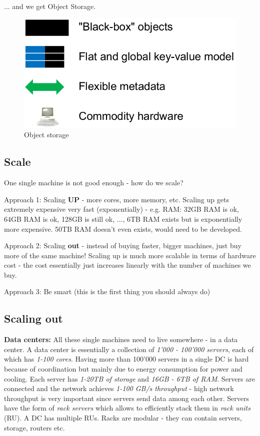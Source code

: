 \documentclass[11pt,oneside,a4paper]{article}
\begin{document}
... and we get Object Storage.\\

\begin{figure}
	\centering
	\includegraphics[width=0.25\linewidth]{figures/object_storage}
	\caption{Object storage}
	\label{fig:objectstorage}
\end{figure}

\subsection{Scale}

One single machine is not good enough - how do we scale?

\begin{compactitem}
	\item Approach 1: Scaling \textbf{UP} - more cores, more memory, etc. Scaling up gets extremely expensive very fast (exponentially) - e.g. RAM: 32GB RAM is ok, 64GB RAM is ok, 128GB is still ok, ..., 6TB RAM exists but is exponentially more expensive. 50TB RAM doesn't even exists, would need to be developed.
	\item Approach 2: Scaling \textbf{out} - instead of buying faster, bigger machines, just buy more of the same machine! Scaling up is much more scalable in terms of hardware cost - the cost essentially just increases linearly with the number of machines we buy.
	\item Approach 3: Be smart (this is the first thing you should always do)\\
\end{compactitem}

\subsection{Scaling out}

\textbf{Data centers:} All these single machines need to live somewhere - in a data center. A data center is essentially a collection of \textit{1'000 - 100'000 servers}, each of which has \textit{1-100 cores}. Having more than 100'000 servers in a single DC is hard because of coordination but mainly due to energy consumption for power and cooling. Each server has \textit{1-20TB of storage} and \textit{16GB - 6TB of RAM}. Servers are connected and the network achieves \textit{1-100 GB/s throughput} - high network throughput is very important since servers send data among each other. Servers have the form of \textit{rack servers} which allows to efficiently stack them in \textit{rack units} (RU). A DC has multiple RUs. Racks are modular - they can contain servers, storage, routers etc.\\
\end{document}

